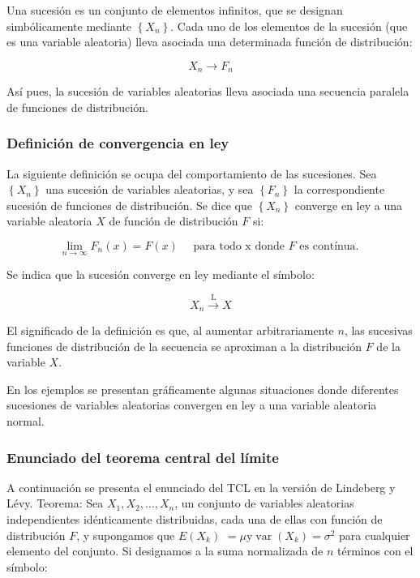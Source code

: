 \documentclass[
]{article}
\begin{document}
Una sucesión es un conjunto de elementos infinitos, que se designan simbólicamente mediante \(\left\{X_{n}\right\}\).
Cada uno de los elementos de la sucesión (que es una variable aleatoria) lleva asociada una determinada función de distribución:

\[
X_{n} \rightarrow F_{n}
\]

Así pues, la sucesión de variables aleatorias lleva asociada una secuencia paralela de funciones de distribución.

\subsubsection{Definición de convergencia en ley}\label{definiciuxf3n-de-convergencia-en-ley}

La siguiente definición se ocupa del comportamiento de las sucesiones.
Sea \(\left\{X_{n}\right\}\) una sucesión de variables aleatorias, y sea \(\left\{F_{n}\right\}\) la correspondiente sucesión de funciones de distribución. Se dice que \(\left\{X_{n}\right\}\) converge en ley a una variable aleatoria \(X\) de función de distribución \(F\) si:

\[
\lim _{n \rightarrow \infty} F_{n}(x)=F(x) \quad \text { para todo } \mathrm{x} \text { donde } F \text { es contínua. }
\]

Se indica que la sucesión converge en ley mediante el símbolo:

\[
X_{n} \stackrel{\mathrm{L}}{\rightarrow} X
\]

El significado de la definición es que, al aumentar arbitrariamente \(n\), las sucesivas funciones de distribución de la secuencia se aproximan a la distribución \(F\) de la variable \(X\).

En los ejemplos se presentan gráficamente algunas situaciones donde diferentes sucesiones de variables aleatorias convergen en ley a una variable aleatoria normal.

\subsubsection{Enunciado del teorema central del límite}\label{enunciado-del-teorema-central-del-luxedmite}

A continuación se presenta el enunciado del TCL en la versión de Lindeberg y Lévy.
Teorema:
Sea \(X_{1}, X_{2}, \ldots, X_{n}\), un conjunto de variables aleatorias independientes idénticamente distribuidas, cada una de ellas con función de distribución \(F\), y supongamos que \(E\left(X_{k}\right)\) \(=\mu \mathrm{y} \operatorname{var}\left(X_{k}\right)=\sigma^{2}\) para cualquier elemento del conjunto. Si designamos a la suma normalizada de \(n\) términos con el símbolo:
\end{document}
